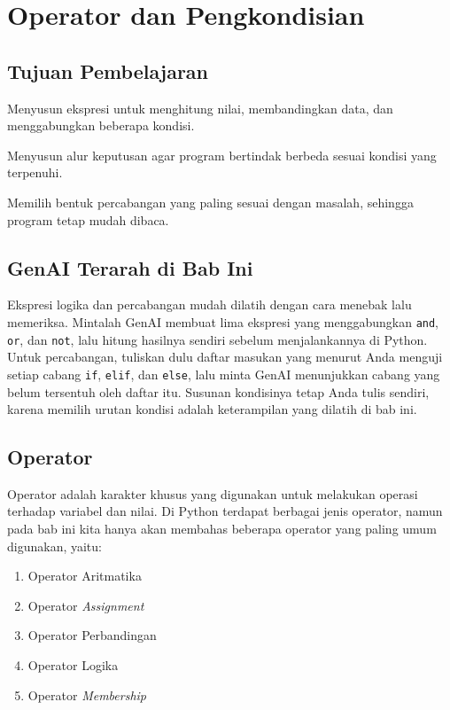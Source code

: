 \chapter{Operator dan Pengkondisian}

\section*{Tujuan Pembelajaran}
\begin{daftarrapat}
  \item Menyusun ekspresi untuk menghitung nilai, membandingkan data, dan menggabungkan beberapa kondisi.
  \item Menyusun alur keputusan agar program bertindak berbeda sesuai kondisi yang terpenuhi.
  \item Memilih bentuk percabangan yang paling sesuai dengan masalah, sehingga program tetap mudah dibaca.
\end{daftarrapat}

\section*{GenAI Terarah di Bab Ini}

Ekspresi logika dan percabangan mudah dilatih dengan cara menebak lalu memeriksa. Mintalah GenAI membuat lima ekspresi yang menggabungkan \texttt{and}, \texttt{or}, dan \texttt{not}, lalu hitung hasilnya sendiri sebelum menjalankannya di Python. Untuk percabangan, tuliskan dulu daftar masukan yang menurut Anda menguji setiap cabang \texttt{if}, \texttt{elif}, dan \texttt{else}, lalu minta GenAI menunjukkan cabang yang belum tersentuh oleh daftar itu. Susunan kondisinya tetap Anda tulis sendiri, karena memilih urutan kondisi adalah keterampilan yang dilatih di bab ini.

\section{Operator}
Operator adalah karakter khusus yang digunakan untuk melakukan operasi terhadap variabel dan nilai. Di Python terdapat berbagai jenis operator, namun pada bab ini kita hanya akan membahas beberapa operator yang paling umum digunakan, yaitu:

\begin{enumerate}
    \item Operator Aritmatika
    \item Operator \textit{Assignment}
    \item Operator Perbandingan
    \item Operator Logika
    \item Operator \textit{Membership}
\end{enumerate}

